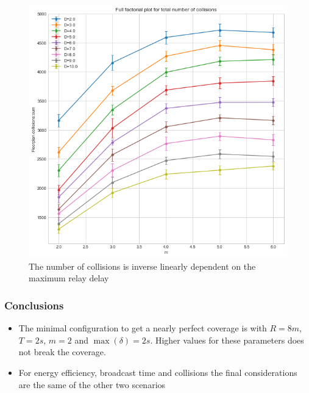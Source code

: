\begin{figure}
	\centering
	\includegraphics[width=\textwidth]{img/rect/collisions-m-ffplot.png}
	\caption{The number of collisions is inverse linearly dependent on the
	maximum	relay delay}\label{fig:rectcollisionsff}
\end{figure}

\subsubsection{Conclusions}\label{subsubsec:rectconclusions}

\begin{itemize}
	\item The minimal configuration to get a nearly perfect coverage is with
		\(R\!=\!8m\), \(T\!=\!2s\), \(m\!=\!2\) and
		\(\max(\delta)\!=\!2s\). Higher values for these parameters does
		not break the coverage.
	\item For energy efficiency, broadcast time and collisions the final
		considerations are the same of the other two scenarios
\end{itemize}
